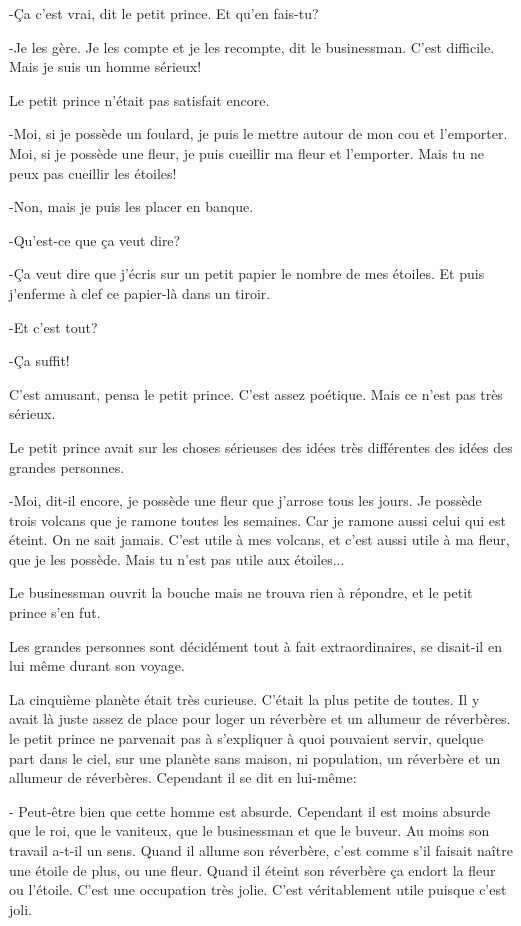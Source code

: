 \documentclass{report}
\begin{document}
-Ça c'est vrai, dit le petit prince. Et qu'en fais-tu?

-Je les gère. Je les compte et je les recompte, dit le businessman. C'est difficile. Mais je suis un homme sérieux!

Le petit prince n'était pas satisfait encore.

-Moi, si je possède un foulard, je puis le mettre autour de mon cou et l'emporter. Moi, si je possède une fleur, je puis cueillir ma fleur et l'emporter. Mais tu ne peux pas cueillir les étoiles!

-Non, mais je puis les placer en banque.

-Qu'est-ce que ça veut dire?

-Ça veut dire que j'écris sur un petit papier le nombre de mes étoiles. Et puis j'enferme à clef ce papier-là dans un tiroir.

-Et c'est tout?

-Ça suffit!

C'est amusant, pensa le petit prince. C'est assez poétique. Mais ce n'est pas très sérieux.

Le petit prince avait sur les choses sérieuses des idées très différentes des idées des grandes personnes.

-Moi, dit-il encore, je possède une fleur que j'arrose tous les jours. Je possède trois volcans que je ramone toutes les semaines. Car je ramone aussi celui qui est éteint. On ne sait jamais. C'est utile à mes volcans, et c'est aussi utile à ma fleur, que je les possède. Mais tu n'est pas utile aux étoiles...

Le businessman ouvrit la bouche mais ne trouva rien à répondre, et le petit prince s'en fut.

Les grandes personnes sont décidément tout à fait extraordinaires, se disait-il en lui même durant son voyage.

\parachapter{} %
La cinquième planète était très curieuse. C'était la plus petite de toutes. Il y avait là juste assez de place pour loger un réverbère et un allumeur de réverbères. le petit prince ne parvenait pas à s'expliquer à quoi pouvaient servir, quelque part dans le ciel, sur une planète sans maison, ni population, un réverbère et un allumeur de réverbères. Cependant il se dit en lui-même:

- Peut-être bien que cette homme est absurde. Cependant il est moins absurde que le roi, que le vaniteux, que le businessman et que le buveur. Au moins son travail a-t-il un sens. Quand il allume son réverbère, c'est comme s'il faisait naître une étoile de plus, ou une fleur. Quand il éteint son réverbère ça endort la fleur ou l'étoile. C'est une occupation très jolie. C'est véritablement utile puisque c'est joli.
\end{document}
